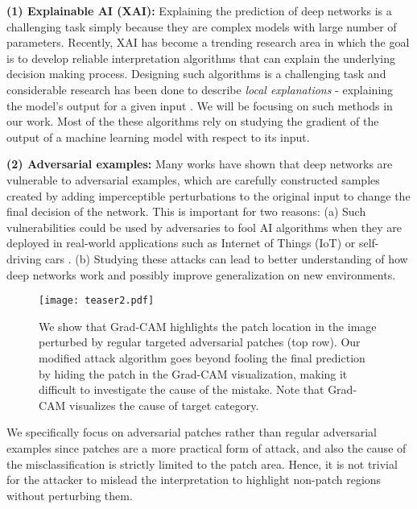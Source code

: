\documentclass[10pt,twocolumn,letterpaper]{article}
\begin{document}
{\bf (1) Explainable AI (XAI):} Explaining the prediction of deep networks is a challenging task simply because they are complex models with large number of parameters. Recently, XAI has become a trending research area in which the goal is to develop reliable interpretation algorithms that can explain the underlying decision making process. Designing such algorithms is a challenging task and considerable research \cite{simonyan2013deep,zhou2016learning,selvaraju2016grad} has been done to describe \textit{local explanations} - explaining the model's output for a given input \cite{baehrens2010explain}. We will be focusing on such methods in our work. Most of the these algorithms rely on studying the gradient of the output of a machine learning model with respect to its input.


{\bf (2) Adversarial examples:} Many works have shown that deep networks are vulnerable to adversarial examples, which are carefully constructed samples created by adding imperceptible perturbations to the original input to change the final decision of the network. This is important for two reasons: (a) Such vulnerabilities could be used by adversaries to fool AI algorithms when they are deployed in real-world applications such as Internet of Things (IoT) \cite{mosenia2017comprehensive} or self-driving cars \cite{sitawarin2018darts}. (b) Studying these attacks can lead to better understanding of how deep networks work and possibly improve generalization on new environments.

\begin{figure*}[!t]
  \begin{center}
\texttt{[image: teaser2.pdf]}
  \caption{We show that Grad-CAM highlights the patch location in the image perturbed by regular targeted adversarial patches \cite{brown2017adversarial} (top row). Our modified attack algorithm goes beyond fooling the final prediction by hiding the patch in the Grad-CAM visualization, making it difficult to investigate the cause of the mistake. Note that Grad-CAM visualizes the cause of target category.}
  \end{center}
\label{teaser}
\end{figure*}

We specifically focus on adversarial patches rather than regular adversarial examples since patches are a more practical form of attack, and also the cause of the misclassification is strictly limited to the patch area. Hence, it is not trivial for the attacker to mislead the interpretation to highlight non-patch regions without perturbing them.
\end{document}
